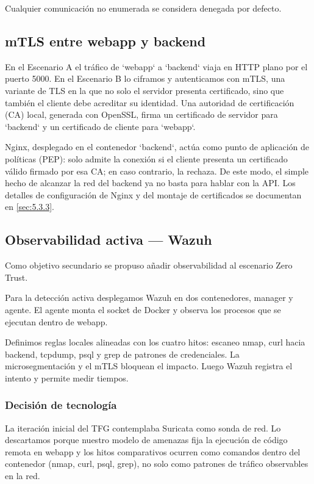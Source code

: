 \documentclass[11pt,spanish,listoffigures,listoftables]{tfgetsinf}
\begin{document}
        Cualquier comunicación no enumerada se considera denegada por defecto.
        
        \subsection{mTLS entre webapp y backend}
        En el Escenario A el tráfico de `webapp` a `backend` viaja en HTTP plano por el puerto 5000. En el Escenario B lo ciframos y autenticamos con mTLS, una variante de TLS en la que no solo el servidor presenta certificado, sino que también el cliente debe acreditar su identidad. Una autoridad de certificación (CA) local, generada con OpenSSL, firma un certificado de servidor para `backend` y un certificado de cliente para `webapp`.
        
        Nginx, desplegado en el contenedor `backend`, actúa como punto de aplicación de políticas (PEP): solo admite la conexión si el cliente presenta un certificado válido firmado por esa CA; en caso contrario, la rechaza. De este modo, el simple hecho de alcanzar la red del backend ya no basta para hablar con la API. Los detalles de configuración de Nginx y del montaje de certificados se documentan en \cref{sec:5.3.3}.
        
        \subsection{Observabilidad activa — Wazuh}
        Como objetivo secundario se propuso añadir observabilidad al escenario Zero Trust.
        
        Para la detección activa desplegamos Wazuh en dos contenedores, manager y agente. El agente monta el socket de Docker y observa los procesos que se ejecutan dentro de webapp.

        Definimos reglas locales alineadas con los cuatro hitos: escaneo nmap, curl hacia backend, tcpdump, psql y grep de patrones de credenciales. La microsegmentación y el mTLS bloquean el impacto. Luego Wazuh registra el intento y permite medir tiempos. 

    \subsubsection{Decisión de tecnología}
    La iteración inicial del TFG contemplaba Suricata como sonda de red. Lo descartamos porque nuestro modelo de amenazas fija la ejecución de código remota en webapp y los hitos comparativos ocurren como comandos dentro del contenedor (nmap, curl, psql, grep), no solo como patrones de tráfico observables en la red.
\end{document}
